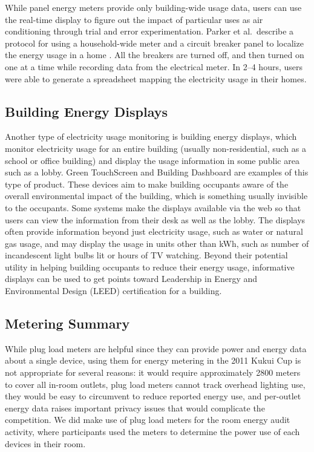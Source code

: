 While panel energy meters provide only building-wide usage data, users can use the real-time display to figure out the impact of particular uses as air conditioning through trial and error experimentation. Parker et al.\ describe a protocol for using a household-wide meter and a circuit breaker panel to localize the energy usage in a home \cite{Parker2006How-Much-Energy}. All the breakers are turned off, and then turned on one at a time while recording data from the electrical meter. In 2--4 hours, users were able to generate a spreadsheet mapping the electricity usage in their homes.

\subsection{Building Energy Displays}
\label{sec:building-energy-displays}

Another type of electricity usage monitoring is building energy displays, which monitor electricity usage for an entire building (usually non-residential, such as a school or office building) and display the usage information in some public area such as a lobby. Green TouchScreen \cite{greentouchscreen} and Building Dashboard \cite{building-dashboard} are examples of this type of product. These devices aim to make building occupants aware of the overall environmental impact of the building, which is something usually invisible to the occupants. Some systems make the displays available via the web so that users can view the information from their desk as well as the lobby. The displays often provide  information beyond just electricity usage, such as water or natural gas usage, and may display the usage in units other than kWh, such as number of incandescent light bulbs lit or hours of TV watching. Beyond their potential utility in helping building occupants to reduce their energy usage, informative displays can be used to get points toward Leadership in Energy and Environmental Design (LEED) certification for a building.


\subsection{Metering Summary}

While plug load meters are helpful since they can provide power and energy data about a single device, using them for energy metering in the 2011 Kukui Cup is not appropriate for several reasons: it would require approximately 2800 meters to cover all in-room outlets, plug load meters cannot track overhead lighting use, they would be easy to circumvent to reduce reported energy use, and per-outlet energy data raises important privacy issues that would complicate the competition. We did make use of plug load meters for the room energy audit activity, where participants used the meters to determine the power use of each devices in their room.

